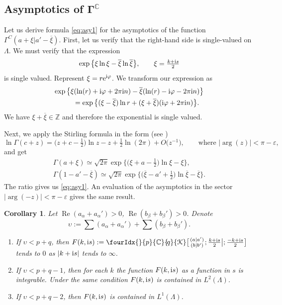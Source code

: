 \documentclass[pdftex]{sigma}
\numberwithin{equation}{section}
\newtheorem{Corollary}[Theorem]{Corollary}
\renewcommand{\Re}{\mathop {\mathrm {Re}}\nolimits}
\newcommand{\Kc}[2]{\fourIdx{}{#1}{\C}{\!#2}{\EuScript K}}
\def\ov{\overline}
\renewcommand{\Re}{\mathop {\mathrm {Re}}\nolimits}
\def\C {{\mathbb C }}
\def\Z{{\mathbb Z}}
\def\epsilon{\varepsilon}
\def\phi{\varphi}
\begin{document}
\subsection[Asymptotics of $\Gamma^\C$]{Asymptotics of $\boldsymbol{\Gamma^\C}$}\label{ss:asy}
Let us derive formula \eqref{eq:asy1} for the asymptotics of the function $\Gamma^C(a+\xi|a'-\ov \xi)$.
First, let us verify that the right-hand side is single-valued
on $\Lambda$.
We must verify that the expression
\[
\exp\big\{ \xi\ln\xi - \ov\xi\ln\ov\xi\big\}, \qquad \xi=\tfrac{k+{\rm i}s}2
\]
is single valued.
Represent $\xi=r {\rm e}^{{\rm i}\phi}$. We transform our expression as
\begin{gather*}
\exp\big\{\xi(\ln(r)+{\rm i}\phi+2\pi {\rm i} n)-
\ov \xi(\ln(r)-{\rm i}\phi-2\pi {\rm i} n) \big\} \\
\qquad{}=\exp\big\{(\xi-\ov\xi) \ln r +(\xi+\ov\xi)({\rm i}\phi+2\pi {\rm i} n) \big\}.
\end{gather*}
We have $\xi+\ov\xi\in \Z$ and therefore the exponential is single valued.

Next, we apply the Stirling formula in the form
(see \cite[equation~(1.18(3))]{HTF1})
\[
\ln
\Gamma(c+z)=\big(z+c-\tfrac12\big)\ln z -z+\tfrac 12\ln(2\pi)+O\big(z^{-1}\big),
\qquad \text{where $|\arg (z)|<\pi-\epsilon$},
\]
and get
\begin{gather*}
\Gamma(a+\xi) \simeq \sqrt{2\pi}\exp
\big\{ \big(\xi+a-\tfrac12\big)\ln\xi-\xi \big\},\\
\Gamma(1-a'-\ov \xi) \simeq \sqrt{2\pi}\exp
\big\{ \big(\ov\xi-a'+\tfrac12\big)\ln\ov\xi-\ov\xi\big\}.
\end{gather*}
The ratio gives us \eqref{eq:asy1}.
An evaluation of the asymptotics in the sector $|\arg(-z)|<\pi-\epsilon$
gives the same result.

\begin{Corollary}\label{cor:L2}
Let $\Re(a_\alpha+a_\alpha')>0$, $\Re(b_\beta+b_\beta')>0$.
Denote
\[
\upsilon:=\sum (a_\alpha+a_\alpha')+\sum(b_\beta+b_\beta').
\]
\begin{enumerate}\itemsep=0pt
\item[$(a)$] If $\upsilon<p+q$, then $F(k,{\rm i}s):=
\Kc{p}{q}\big[\genfrac{}{}{0pt}{}{(a|a')}{(b|b')};\tfrac{k+{\rm i}s}{2}\bigl|;\tfrac{-k+{\rm i}s}{2}\big]$
tends to $0$ as $|k+{\rm i}s|$ tends to $\infty$.
\item[$(b)$]
If $\upsilon<p+q-1$, then for each $k$ the function $F(k,{\rm i}s)$ as a
function in $s$ is integrable.
Under the same condition $F(k,{\rm i}s)$ is contained in $L^2(\Lambda)$.
\item[$(c)$]
If $\upsilon<p+q-2$, then $F(k,{\rm i}s)$ is contained in $L^1(\Lambda)$.
\end{enumerate}
\end{Corollary}
\end{document}
